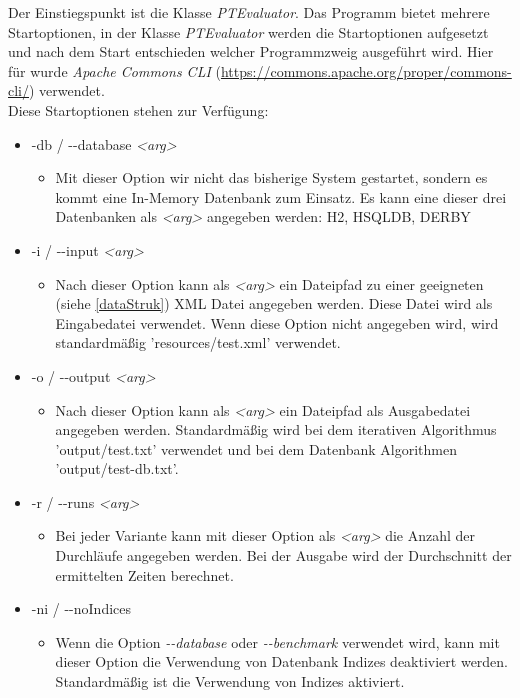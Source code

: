 \documentclass[draft,final]{vutinfth} %
\begin{document}
Der Einstiegspunkt ist die Klasse \textit{PTEvaluator}. Das Programm bietet mehrere Startoptionen, in der Klasse \textit{PTEvaluator} werden die Startoptionen aufgesetzt und nach dem Start entschieden welcher Programmzweig ausgeführt wird. Hier für wurde \textit{Apache Commons CLI} (\url{https://commons.apache.org/proper/commons-cli/}) verwendet. \\
Diese Startoptionen stehen zur Verfügung:
\begin{itemize}
	\item -db / -{}-database \textit{<arg>}
	\begin{itemize}
		\item Mit dieser Option wir nicht das bisherige System gestartet, sondern es kommt eine In-Memory Datenbank zum Einsatz. Es kann eine dieser drei Datenbanken als \textit{<arg>} angegeben werden: H2, HSQLDB, DERBY
	\end{itemize}
	\item -i / -{}-input \textit{<arg>}
	\begin{itemize}
		\item Nach dieser Option kann als \textit{<arg>} ein Dateipfad zu einer geeigneten (siehe \ref{dataStruk}) XML Datei angegeben werden. Diese Datei wird als Eingabedatei verwendet. Wenn diese Option nicht angegeben wird, wird standardmä\ss ig 'resources/test.xml' verwendet.
	\end{itemize}
	\item -o / -{}-output \textit{<arg>}
	\begin{itemize}
		\item Nach dieser Option kann als \textit{<arg>} ein Dateipfad als Ausgabedatei angegeben werden. Standardmä\ss ig wird bei dem iterativen Algorithmus 'output/test.txt' verwendet und bei dem Datenbank Algorithmen 'output/test-db.txt'.
	\end{itemize}
	\item -r / -{}-runs \textit{<arg>}
	\begin{itemize}
		\item Bei jeder Variante kann mit dieser Option als \textit{<arg>} die Anzahl der Durchläufe angegeben werden. Bei der Ausgabe wird der Durchschnitt der ermittelten Zeiten berechnet. 
	\end{itemize}
	\item -ni / -{}-noIndices
	\begin{itemize}
		\item Wenn die Option \textit{-{}-database} oder \textit{-{}-benchmark} verwendet wird, kann mit dieser Option die Verwendung von Datenbank Indizes deaktiviert werden. Standardmä\ss ig ist die Verwendung von Indizes aktiviert.

\end{itemize}
\end{itemize}
\end{document}
